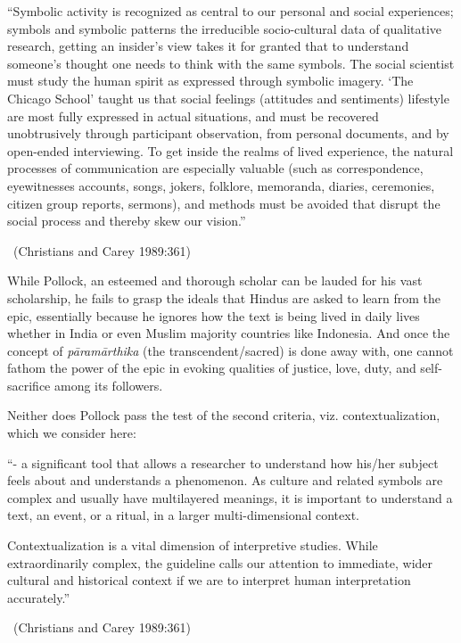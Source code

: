 \begin{myquote}
“Symbolic activity is recognized as central to our personal and social experiences; symbols and symbolic patterns the irreducible socio-cultural data of qualitative research, getting an insider’s view takes it for granted that to understand someone’s thought one needs to think with the same symbols. The social scientist must study the human spirit as expressed through symbolic imagery. ‘The Chicago School’ taught us that social feelings (attitudes and sentiments) lifestyle are most fully expressed in actual situations, and must be recovered unobtrusively through participant observation, from personal documents, and by open-ended interviewing. To get inside the realms of lived experience, the natural processes of communication are especially valuable (such as correspondence, eyewitnesses accounts, songs, jokers, folklore, memoranda, diaries, ceremonies, citizen group reports, sermons), and methods must be avoided that disrupt the social process and thereby skew our vision.” 

\vskip -5pt

~\hfill (Christians and Carey 1989:361)
\end{myquote}

While Pollock, an esteemed and thorough scholar can be lauded for his vast scholarship, he fails to grasp the ideals that Hindus are asked to learn from the epic, essentially because he ignores how the text is being lived in daily lives whether in India or even Muslim majority countries like Indonesia. And once the concept of \textit{pāramārthika} (the transcendent/sacred) is done away with, one cannot fathom the power of the epic in evoking qualities of justice, love, duty, and self-sacrifice among its followers.

Neither does Pollock pass the test of the second criteria, viz. contextualization, which we consider here:

\begin{myquote}
“- a significant tool that allows a researcher to understand how his/her subject feels about and understands a phenomenon. As culture and related symbols are complex and usually have multilayered meanings, it is important to understand a text, an event, or a ritual, in a larger multi-dimensional context.
\end{myquote}

\begin{myquote}
Contextualization is a vital dimension of interpretive studies. While extraordinarily complex, the guideline calls our attention to immediate, wider cultural and historical context if we are to interpret human interpretation accurately.” 

\vskip -5pt

~\hfill (Christians and Carey 1989:361)
\end{myquote}

